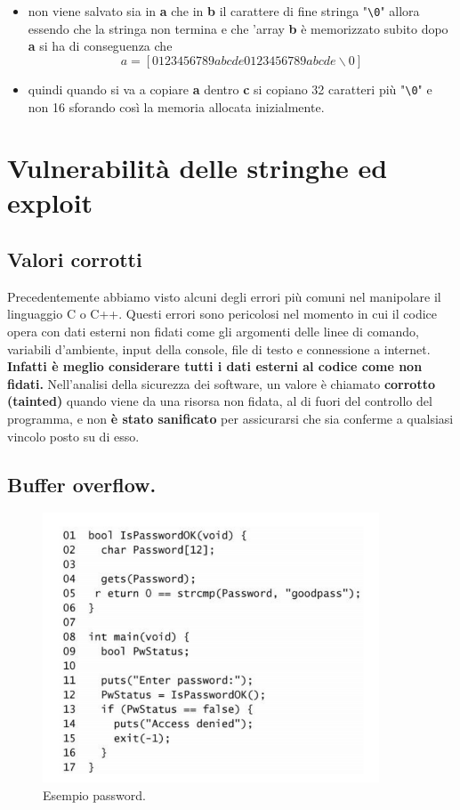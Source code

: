 \begin{itemize}
    \item non viene salvato sia in \textbf{a} che in \textbf{b} il carattere di fine
          stringa "\verb|\0|" allora essendo che la stringa non termina
          e che 'array \textbf{b} è memorizzato subito dopo \textbf{a} si ha di conseguenza che
          \[a = [0123456789abcde0123456789abcde\backslash 0]\]
    \item quindi quando si va a copiare \textbf{a} dentro \textbf{c} si copiano 32
          caratteri più "\verb|\0|" e non 16 sforando così la memoria allocata inizialmente.
\end{itemize}

\section{Vulnerabilità delle stringhe ed exploit}

\subsection{Valori corrotti}

Precedentemente abbiamo visto alcuni degli errori più comuni nel manipolare il
linguaggio C o C++. Questi errori sono pericolosi nel momento in cui il codice opera
con dati esterni non fidati come gli argomenti delle linee di comando, variabili
d'ambiente, input della console, file di testo e connessione a internet.
\textbf{Infatti è meglio considerare tutti i dati esterni al codice come non fidati. }
Nell'analisi della sicurezza dei software, un valore è
chiamato \textbf{corrotto (tainted)} quando viene da una risorsa non fidata, al di
fuori del controllo del programma, e non \textbf{è stato sanificato} per assicurarsi
che sia conferme a qualsiasi vincolo posto su di esso.

\subsection{Buffer overflow.}

\begin{figure}[H]
    \centering
    \includegraphics[width=10cm, keepaspectratio]{capitoli/secure_coding/img/cap_2/password_example.png}
    \caption{Esempio password.}\label{fig:password}
\end{figure}

